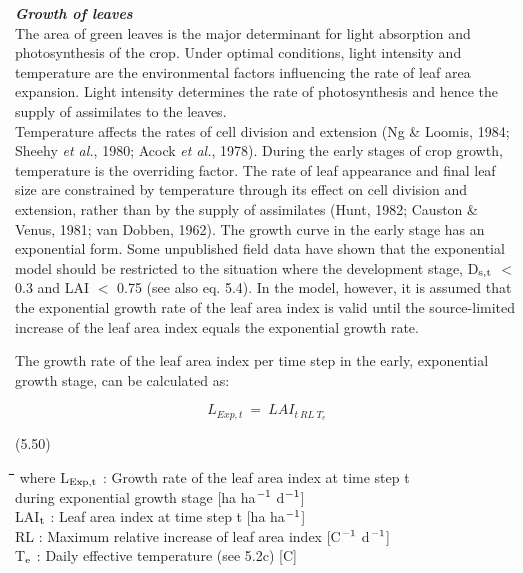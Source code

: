 {\it {\bf Growth of leaves}\/}\\
The area of green leaves is the major determinant for light absorption and photosyn\-thesis
of the crop. Under optimal conditions, light intensity and temperature are the environ\-mental factors influencing the rate of leaf area expansion. Light intensity determines the
rate of photosynthesis and hence the supply of assimilates to the leaves. \\
Temperature affects the rates of cell division and extension (Ng \& Loomis, 1984; Sheehy
{\it et al.\/}, 1980; Acock {\it et al.\/}, 1978). During the early stages of crop growth, temperature is
the overriding factor. The rate of leaf appearance and final leaf size are constrained by
temperature through its effect on cell division and extension, rather than by the supply of
assimilates (Hunt, 1982; Causton \& Venus, 1981; van Dobben, 1962). The growth curve
in the early stage has an exponential form. Some unpublished field data have shown that
the exponential model should be restricted to the situation where the develop\-ment stage, 
D$_{{\rm s,t}}$ $<$ 0.3 and LAI $<$ 0.75 (see also eq. 5.4). In the model, however, it is assumed that
the exponen\-tial growth rate of the leaf area index is valid until the source-limited increase
of the leaf area index equals the exponential growth rate.



The growth rate of the leaf area index per time step in the early, exponential growth
stage, can be calculated as:

\begin{displaymath}
L _{Exp,t} ~=~LAI _{{t~RL~T}_{e}}
\end{displaymath}

 
\strut\hfill (5.50)
\nwln
\begin{tabbing}
\hspace{1.27cm}\=\hspace{1.27cm}\=\hspace{1.27cm}\=\hspace{1.27cm}\=%
\hspace{1.27cm}\=\hspace{1.27cm}\=\hspace{1.27cm}\=\hspace{1.27cm}\=%
\hspace{1.27cm}\=\hspace{1.27cm}\=\kill
where L$_{{\rm Exp,t}}$ : Growth rate of the leaf area index at time step t\\
   during exponential growth stage        [ha ha$^{{\rm -1}}$ d$^{{\rm -1}}$]\\
LAI$_{{\rm t}}$ : Leaf area index at time step t         [ha ha$^{{\rm -1}}$]\\
RL : Maximum relative increase of leaf area index         [\degrees C$^{{\rm -1}}$ d$^{{\rm -1}}$]\\
T$_{{\rm e}}$ : Daily effective temperature (see 5.2c)        [\degrees C]
\end{tabbing}



